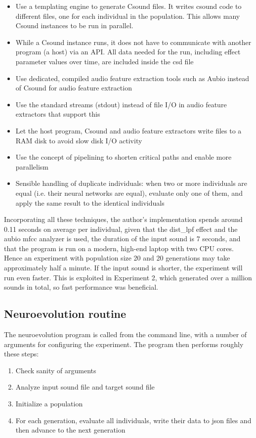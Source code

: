 \begin{itemize}  
\item Use a templating engine to generate Csound files. It writes csound code to different files, one for each individual in the population. This allows many Csound instances to be run in parallel.
\item While a Csound instance runs, it does not have to communicate with another program (a host) via an API. All data needed for the run, including effect parameter values over time, are included inside the csd file
\item Use dedicated, compiled audio feature extraction tools such as Aubio instead of Csound for audio feature extraction
\item Use the standard streams (stdout) instead of file I/O in audio feature extractors that support this
\item Let the host program, Csound and audio feature extractors write files to a RAM disk to avoid slow disk I/O activity
\item Use the concept of pipelining to shorten critical paths and enable more parallelism
\item Sensible handling of duplicate individuals: when two or more individuals are equal (i.e. their neural networks are equal), evaluate only one of them, and apply the same result to the identical individuals
\end{itemize}

Incorporating all these techniques, the author's implementation spends around 0.11 seconds on average per individual, given that the dist\_lpf effect and the aubio mfcc analyzer is used, the duration of the input sound is 7 seconds, and that the program is run on a modern, high-end laptop with two CPU cores. Hence an experiment with population size 20 and 20 generations may take approximately half a minute. If the input sound is shorter, the experiment will run even faster. This is exploited in Experiment 2, which generated over a million sounds in total, so fast performance was beneficial.

\subsection{Neuroevolution routine}
The neuroevolution program is called from the command line, with a number of arguments for configuring the experiment. The program then performs roughly these steps:

\begin{enumerate}  
\item Check sanity of arguments
\item Analyze input sound file and target sound file
\item Initialize a population
\item For each generation, evaluate all individuals, write their data to json files and then advance to the next generation
\end{enumerate}

